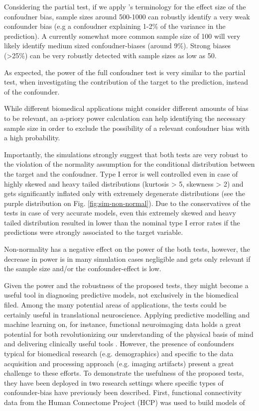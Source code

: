 \documentclass{article}
\begin{document}
Considering the partial test, if we apply \citeauthor{cohen2013statistical}'s terminology for the effect size of the confoudner bias, sample sizes around 500-1000 can robustly identify a very weak confounder bias (e.g a confoudner explaining 1-2\% of the variance in the prediction). A currently somewhat more common sample size of 100 will very likely identify medium sized confoudner-biases (around 9\%). Strong biases  (>25\%) can be very robustly detected with sample sizes as low as 50. 

As expected, the power of the full confoudner test is very similar to the partial test, when investigating the contribution of the target to the prediction, instead of the confounder.

While different biomedical applications might consider different amounts of bias to be relevant, an a-priory power calculation can help identifying the necessary sample size in order to exclude the possibility of a relevant confoudner bias with a high probability.

Importantly, the simulations strongly suggest that both tests are very robust to the violation of the normality assumption for the conditional distribution between the target and the confoudner. Type I error is well controlled even in case of highly skewed and heavy tailed distributions (kurtosis > 5, skewness > 2) and gets significantly inflated only with extremely degenerate distributions (see the purple distribution on Fig. \ref{fig:sim-non-normal}). Due to the conservatives of the tests in case of very accurate models, even this extremely skewed and heavy tailed distribution resulted in lower than the nominal type I error rates if the predictions were strongly associated to the target variable.

Non-normality has a negative effect on the power of the both tests, however, the decrease in power is in many simulation cases negligible and gets only relevant if the sample size and/or the confounder-effect is low.

Given the power and the robustness of the proposed tests, they might become a useful tool in diagnosing predictive models, not exclusively in the biomedical filed. Among the many potential areas of applications, the tests could be certainly useful in translational neuroscience. Applying predictive modelling and machine learning on, for instance, functional neuroimaging data holds a great potential for both revolutionizing our understanding of the physical basis of mind and delivering clinically useful tools \citep{woo2017building, wager2013fmri, spisak2020pain}. However, the presence of confounders typical for biomedical research (e.g. demographics) and specific to the data acquisition and processing approach (e.g. imaging artifacts) present a great challenge to these efforts.
To demonstrate the usefulness of the proposed tests, they have been deployed in two research settings where specific types of confounder-bias have previously been described. 
First, functional connectivity data from the Human Connectome Project (HCP) \citep{van2013wu} was used to build models of 
\end{document}
